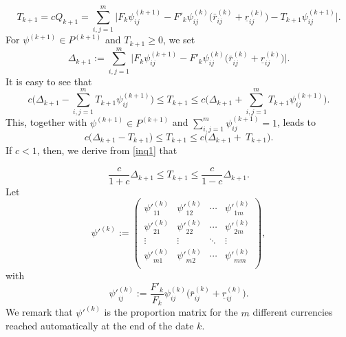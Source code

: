 \documentclass[11pt]{article}
\numberwithin{equation}{section}
\begin{document}
\begin{equation}\label{decrement}
T_{k+1} =cQ_{k+1}=
\sum_{i,j=1}^{m} \Big|F_{k}\psi^{(k+1)}_{ij}-F'_k \psi^{(k)}_{ij}\Big(\bar r^{(k)}_{ij}+\underline r^{(k)}_{ij}\Big)-T_{k+1}\psi^{(k+1)}_{ij}\Big|.
\end{equation}
For  $\psi^{(k+1)}\in P^{(k+1)}$ and $T_{k+1}\geqslant 0$, we set $$\Delta _{k+1}:=\sum_{i,j=1}^{m} \Big|F_k\psi^{(k+1)}_{ij}-F'_k\psi^{(k)}_{ij}\Big(\bar r^{(k)}_{ij}+\underline r^{(k)}_{ij}\Big)\Big|.$$ 
It is easy to see that
\begin{equation*} 
c\Big(\Delta _{k+1}-\sum_{i,j=1}^{m} T_{k+1}\psi^{(k+1)}_{ij}\Big)\le T_{k+1} \le c\Big(\Delta _{k+1}+\sum_{i,j=1}^{m} T_{k+1}\psi^{(k+1)}_{ij}\Big).
\end{equation*}
This, together with $\psi^{(k+1)}\in P^{(k+1)}$ and $\sum_{i,j=1}^{m} \psi^{(k+1)}_{ij}=1$,  leads to  
\begin{equation}\label{inq1}
c\Big(\Delta _{k+1}-T_{k+1}\Big)\le T_{k+1} \le c\Big(\Delta _{k+1}+\ T_{k+1}\Big).
\end{equation}
If  $c<1$,  then, we derive from   \eqref{inq1}  that 

\begin{equation}\label{ineq1}
\frac{c}{1+c}\Delta_{k+1}  \leqslant T_{k+1} \leqslant \frac{c}{1-c}\Delta_{k+1}.
\end{equation}
Let 
\begin{equation*}
	{\psi'}^{(k)}:= \left(\begin{array}{ccccc}
	{\psi'}_{11}^{(k)} & {\psi'}_{12}^{(k)}&\cdots&{\psi'}_{1m}^{(k)}\\
	{\psi'}_{21}^{(k)} & {\psi'}_{22}^{(k)}&\cdots&{\psi'}_{2m}^{(k)}\\
	\vdots & \vdots& \ddots&\vdots\\
	{\psi'}_{m1}^{(k)} & {\psi'}_{m2}^{(k)}&\cdots&{\psi'}_{mm}^{(k)}\\
	\end{array}
	\right),
	\end{equation*}
with  	
\begin{equation}\label{p1}
{\psi'}^{(k)}_{ij}:=\frac{F'_k}{F_k}\psi^{(k)}_{ij}\Big(\bar r^{(k)}_{ij}+\underline r^{(k)}_{ij}\Big).
\end{equation}	
We remark that ${\psi'}^{(k)}$ is the proportion matrix for the $m$ different currencies reached automatically  at the end of the date $k$. 
\end{document}
